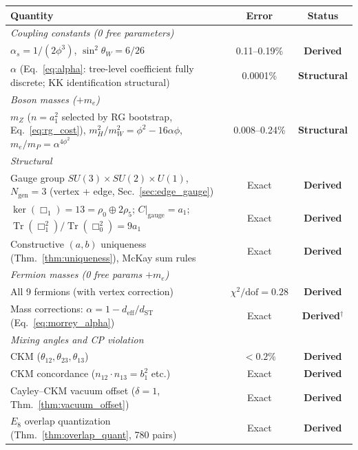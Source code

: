 \documentclass[12pt,a4paper]{article}
\theoremstyle{definition}
\begin{document}
\begin{table}[H]
\centering\footnotesize
\begin{tabular}{lcc}
\toprule
\textbf{Quantity} & \textbf{Error} & \textbf{Status} \\
\midrule
\multicolumn{3}{l}{\textit{Coupling constants (0 free parameters)}} \\
$\alpha_s = 1/(2\phi^3)$, $\sin^2\theta_W = 6/26$ & 0.11--0.19\% & \textbf{Derived} \\
$\alpha$ (Eq.~\ref{eq:alpha}: tree-level coefficient fully discrete; KK identification structural) & 0.0001\% & \textbf{Structural} \\
\midrule
\multicolumn{3}{l}{\textit{Boson masses ($+m_e$)}} \\
$m_Z$ ($n\!=\!a_1^2$ selected by RG bootstrap, Eq.~\ref{eq:rg_cost}), $m_H^2/m_W^2 = \phi^2 - 16\alpha\phi$, $m_e/m_P = \alpha^{4\phi^2}$ & 0.008--0.24\% & \textbf{Structural} \\
\midrule
\multicolumn{3}{l}{\textit{Structural}} \\
Gauge group $SU(3) \times SU(2) \times U(1)$, $N_{\text{gen}} = 3$ (vertex + edge, Sec.~\ref{sec:edge_gauge}) & Exact & \textbf{Derived} \\
$\ker(\Box_1) = 13 = \rho_0 \oplus 2\rho_5$; $C|_{\text{gauge}} = a_1$; $\operatorname{Tr}(\Box_1^2)/\operatorname{Tr}(\Box_0^2) = 9a_1$ & Exact & \textbf{Derived} \\
Constructive $(a,b)$ uniqueness (Thm.~\ref{thm:uniqueness}), McKay sum rules & Exact & \textbf{Derived} \\
\midrule
\multicolumn{3}{l}{\textit{Fermion masses (0 free params $+ m_e$)}} \\
All 9 fermions (with vertex correction) & $\chi^2/\text{dof} = 0.28$ & \textbf{Derived} \\
Mass corrections: $\alpha = 1 - d_{\text{eff}}/d_{\text{ST}}$ (Eq.~\ref{eq:morrey_alpha}) & Exact & \textbf{Derived}$^\dagger$ \\
\midrule
\multicolumn{3}{l}{\textit{Mixing angles and CP violation}} \\
CKM ($\theta_{12}, \theta_{23}, \theta_{13}$) & $<0.2\%$ & \textbf{Derived} \\
CKM concordance ($n_{12}\!\cdot\! n_{13} = b_1^2$ etc.) & Exact & \textbf{Derived} \\
Cayley--CKM vacuum offset ($\delta = 1$, Thm.~\ref{thm:vacuum_offset}) & Exact & \textbf{Derived} \\
$E_8$ overlap quantization (Thm.~\ref{thm:overlap_quant}, 780 pairs) & Exact & \textbf{Derived} \\

\end{tabular}
\end{table}
\end{document}

